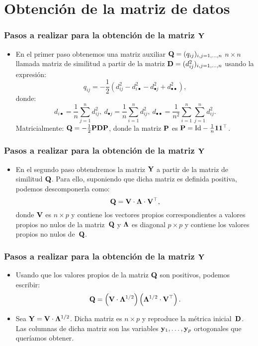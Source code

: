 \section{Obtención de la matriz de datos}
\begin{frame}
\frametitle{Pasos a realizar para la obtención de la matriz $\mathbf{Y}$}
\begin{itemize}
\item<2->{En el primer paso obtenemos una matriz auxiliar $\mathbf{Q}=(q_{ij})_{i,j=1,\ldots,n}$ $n\times n$ llamada matriz de similitud a partir de la matriz $\mathbf{D}=(d_{ij}^2)_{i,j=1,\ldots,n}$ usando la expresión:
$$
q_{ij} = -\frac{1}{2}\left(d_{ij}^2 -d_{i\bullet}^2 -d_{\bullet j}^2 +d_{\bullet\bullet}^2\right),
$$
donde:
$$
d_{i\bullet}=\frac{1}{n}\sum_{j=1}^n d_{ij}^2,\ d_{\bullet j}=\frac{1}{n}\sum_{i=1}^n d_{ij}^2,\ d_{\bullet \bullet}=\frac{1}{n^2}\sum_{i=1}^n\sum_{j=1}^n d_{ij}^2.
$$
Matricialmente: $\mathbf{Q}=-\frac{1}{2}\mathbf{P}\mathbf{D}\mathbf{P}$, donde la matriz $\mathbf{P}$ es $\mathbf{P}=\mathbf{\rm{Id}}-\frac{1}{n}\mathbf{1}\mathbf{1}^\top$.}
\end{itemize}
\end{frame}

\begin{frame}
\frametitle{Pasos a realizar para la obtención de la matriz $\mathbf{Y}$}
\begin{itemize}
\item<2->{En el segundo paso obtendremos la matriz $\mathbf{Y}$ a partir de la matriz de similitud $\mathbf{Q}$. Para ello, suponiendo que dicha matriz es definida positiva, podemos descomponerla como:
$$
\mathbf{Q}=\mathbf{V}\cdot \mathbf{\Lambda}\cdot\mathbf{V}^{\top},
$$
donde $\mathbf{V}$ es $n\times p$ y contiene los vectores propios correspondientes a valores propios no nulos de la matriz~$\mathbf{Q}$ y $\mathbf{\Lambda}$ es diagonal $p\times p$ y contiene los valores propios no nulos de~$\mathbf{Q}$.}
\end{itemize}
\end{frame}

\begin{frame}
\frametitle{Pasos a realizar para la obtención de la matriz $\mathbf{Y}$}
\begin{itemize}
\item<2->{Usando que los valores propios de la matriz $\mathbf{Q}$ son positivos, podemos escribir:
$$
\mathbf{Q}=\left(\mathbf{V}\cdot \mathbf{\Lambda}^{1/2}\right)\left(\mathbf{\Lambda}^{1/2}\cdot\mathbf{V}^{\top}\right).
$$}
\item<3->{Sea $\mathbf{Y}=\mathbf{V}\cdot \mathbf{\Lambda}^{1/2}$. Dicha matriz es $n\times p$ y reproduce la métrica inicial~$\mathbf{D}$. Las columnas de dicha matriz son las variables $\mathbf{y}_1,\ldots,\mathbf{y}_p$ ortogonales que queríamos obtener.}
\end{itemize}
\end{frame}
